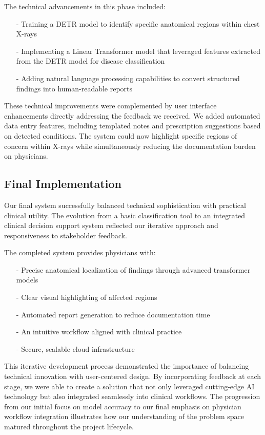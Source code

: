\documentclass{article}
\begin{document}
\noindent The technical advancements in this phase included:

\begin{itemize}
    \item[-] Training a DETR model to identify specific anatomical regions within chest X-rays
    \item[-] Implementing a Linear Transformer model that leveraged features extracted from the DETR model for disease classification
    \item[-] Adding natural language processing capabilities to convert structured findings into human-readable reports
\end{itemize}

\noindent These technical improvements were complemented by user interface enhancements directly addressing the feedback we received. We added automated data entry features, including templated notes and prescription suggestions based on detected conditions. The system could now highlight specific regions of concern within X-rays while simultaneously reducing the documentation burden on physicians.

\subsection{Final Implementation}

Our final system successfully balanced technical sophistication with practical clinical utility. The evolution from a basic classification tool to an integrated clinical decision support system reflected our iterative approach and responsiveness to stakeholder feedback. 

\noindent The completed system provides physicians with:
\begin{itemize}
    \item[-] Precise anatomical localization of findings through advanced transformer models
    \item[-] Clear visual highlighting of affected regions 
    \item[-] Automated report generation to reduce documentation time
    \item[-] An intuitive workflow aligned with clinical practice
    \item[-] Secure, scalable cloud infrastructure
\end{itemize}

\noindent This iterative development process demonstrated the importance of balancing technical innovation with user-centered design. By incorporating feedback at each stage, we were able to create a solution that not only leveraged cutting-edge AI technology but also integrated seamlessly into clinical workflows. The progression from our initial focus on model accuracy to our final emphasis on physician workflow integration illustrates how our understanding of the problem space matured throughout the project lifecycle.
\end{document}

